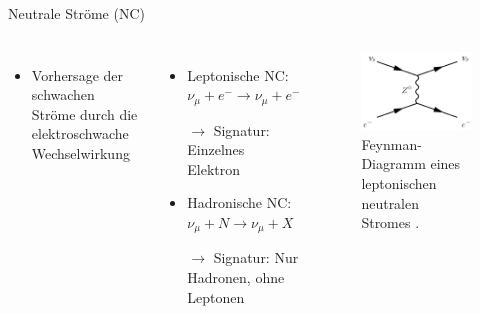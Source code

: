 \documentclass[aspectratio=1610, professionalfonts, 10pt]{beamer}
\begin{document}
\begin{frame}{Neutrale Ströme (NC)}
	\begin{columns}
				\begin{itemize}
					  \setlength\itemsep{0.5em}
					\item Vorhersage der schwachen Ströme durch die elektroschwache Wechselwirkung
				\end{itemize}
				\vspace*{20px}
				\begin{itemize}
					\setlength\itemsep{0.5em}
					\item Leptonische NC: $\nu_\mu + e^- \rightarrow \nu_\mu + e^-$
					\item[$\rightarrow$] Signatur: Einzelnes Elektron
					\item Hadronische NC: $\nu_\mu + N \rightarrow \nu_\mu + X$
					\item[$\rightarrow$] Signatur: Nur Hadronen, ohne Leptonen
				\end{itemize}
			\begin{figure}
	  			\centering
				\includegraphics[width=\linewidth]{Images/Neutral_current,_leptonic_event,_muon_neutrino.png}
	  			\caption{Feynman-Diagramm eines leptonischen neutralen Stromes \cite{wiki:NC}.}
	  			\label{fig:feynman}
			\end{figure}
	\end{columns}
\end{frame}
\end{document}
